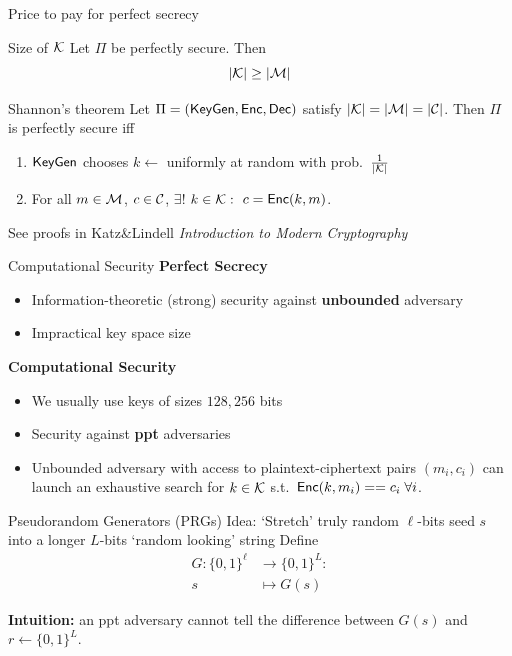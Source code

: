 \documentclass[usenames,dvipsnames, 9pt,aspectratio=169]{beamer}
\begin{document}
\begin{frame}{Price to pay for perfect secrecy}
\Large
	\begin{block}{Size of $\mathcal{K}$}
		Let $\Pi$ be perfectly secure. Then
		\[
			|\mathcal{K}| \geq |\mathcal{M}|
		\]
	\end{block}

	\vspace{10pt}
	
	\begin{block}{Shannon's theorem}
		Let $\Pi = (\textsf{KeyGen}, \textsf{Enc}, \textsf{Dec})$ satisfy $|\mathcal{K}| = |\mathcal{M}| = |\mathcal{C}|$. Then $\Pi$ is perfectly secure iff
		\begin{enumerate}
			\item $\textsf{KeyGen}$ chooses $k \leftarrow$ uniformly at random with prob.\ $\frac{1}{|\mathcal{K}|}$
			\item For all $m \in \mathcal{M}$, $c \in \mathcal{C}$, $\exists!$ $k \in \mathcal{K}:\,$ $c = \textsf{Enc}(k,m)$.
		\end{enumerate}
	\end{block}
	
	\vspace{15pt}
	\large
	\centering
	See proofs in Katz\&Lindell \textit{Introduction to Modern Cryptography}
\end{frame}

\begin{frame}{Computational Security}
\Large
	{\color{Orange}\textbf{Perfect Secrecy}}
	\begin{itemize}
		\item Information-theoretic (strong) security against {\color{Orange}\textbf{unbounded}} adversary
		\item Impractical key space size
	\end{itemize}
		\vspace{15pt}
	{\color{Orange}\textbf{Computational Security}}
	\begin{itemize}
		\item We usually use keys of sizes $128, 256$ bits
		\item Security against {\color{Orange}\textbf{ppt}} adversaries
		\item Unbounded adversary with access to plaintext-ciphertext pairs $(m_i, c_i)$ can launch an exhaustive search for $k \in \mathcal{K}$ s.t.\ $\textsf{Enc}(k, m_i) == c_i \; \forall i$.
	\end{itemize}
\end{frame}

\begin{frame}{Pseudorandom Generators (PRGs)}
\LARGE 
	Idea: `Stretch' truly random $\ell$-bits seed $s$ into a longer $L$-bits `random looking' string  
	\vspace{15pt}
	Define
	\LARGE
	\begin{align*}
		G : \{0,1\}^{\ell} & \rightarrow \{0,1\}^{L}:	\\
		s & \mapsto G(s) 
	\end{align*}
	
	{\color{Orange}\textbf{Intuition:}} an ppt adversary cannot tell the difference between $G(s)$ and $r \leftarrow \{0,1\}^L$.
	
\end{frame}
\end{document}
